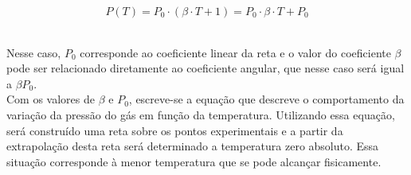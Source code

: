 \[ P(T) = P_0 \cdot (\beta \cdot T + 1) = P_0 \cdot \beta \cdot T + P_0 \]\

Nesse caso, $P_0$ corresponde ao coeficiente linear da reta e o valor do coeficiente $\beta$ pode ser relacionado diretamente ao coeficiente angular, que nesse caso será igual a $\beta P_0$.\\

Com os valores de $\beta$ e $P_0$, escreve-se a equação que descreve o comportamento da variação da pressão do gás em função da temperatura. Utilizando essa equação, será construído uma reta sobre os pontos experimentais e a partir da extrapolação desta reta será determinado a temperatura zero absoluto. Essa situação corresponde à menor temperatura que se pode alcançar fisicamente.\\